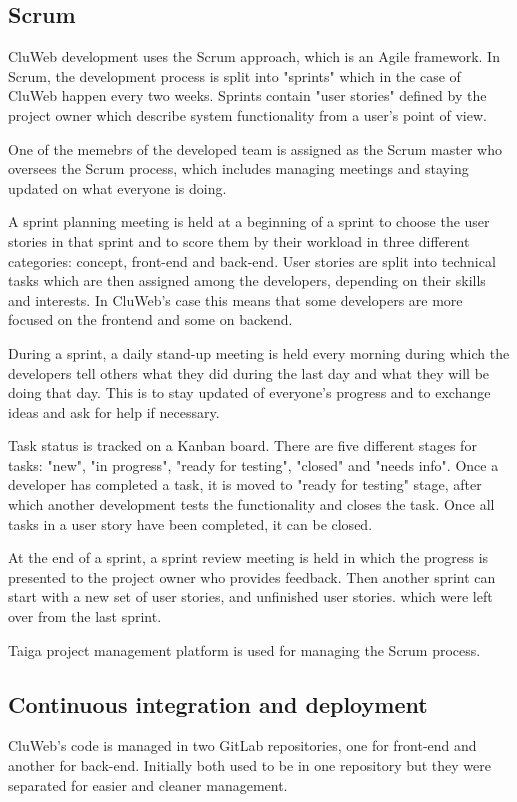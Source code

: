 \subsection{Scrum}
CluWeb development uses the Scrum approach, which is an Agile framework.
In Scrum, the development process is split into "sprints" which in the case of CluWeb happen every two weeks. Sprints contain "user stories" defined by the project owner which describe system functionality from a user's point of view.

One of the memebrs of the developed team is assigned as the Scrum master who oversees the Scrum process, which includes managing meetings and staying updated on what everyone is doing.

A sprint planning meeting is held at a beginning of a sprint to choose the user stories in that sprint and to score them by their workload in three different categories: concept, front-end and back-end. User stories are split into technical tasks which are then assigned among the developers, depending on their skills and interests. In CluWeb's case this means that some developers are more focused on the frontend and some on backend.

During a sprint, a daily stand-up meeting is held every morning during which the developers tell others what they did during the last day and what they will be doing that day. This is to stay updated of everyone's progress and to exchange ideas and ask for help if necessary.

Task status is tracked on a Kanban board. There are five different stages for tasks: "new", "in progress", "ready for testing", "closed" and "needs info". Once a developer has completed a task, it is moved to "ready for testing" stage, after which another development tests the functionality and closes the task. Once all tasks in a user story have been completed, it can be closed.

At the end of a sprint, a sprint review meeting is held in which the progress is presented to the project owner who provides feedback. Then another sprint can start with a new set of user stories, and unfinished user stories. which were left over from the last sprint.

\cite{scrum}

Taiga project management platform is used for managing the Scrum process.

\subsection{Continuous integration and deployment}
CluWeb's code is managed in two GitLab repositories, one for front-end and another for back-end. Initially both used to be in one repository but they were separated for easier and cleaner management.

